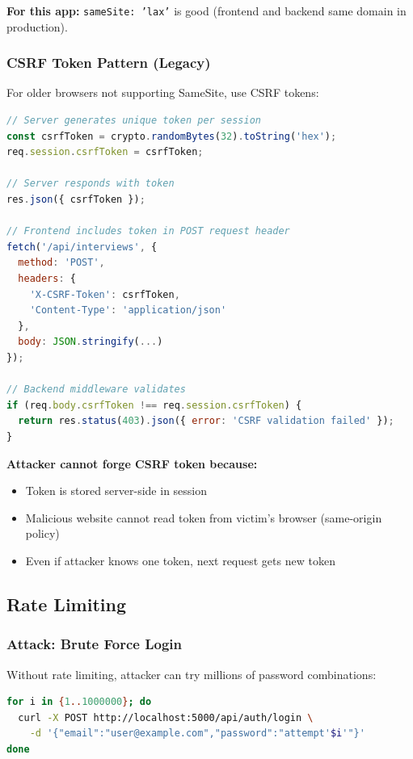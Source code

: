 \documentclass[12pt,a4paper,oneside]{article}
\begin{document}
\textbf{For this app:} \texttt{sameSite: 'lax'} is good (frontend and backend same domain in production).

\subsubsection{CSRF Token Pattern (Legacy)}

For older browsers not supporting SameSite, use CSRF tokens:

\begin{lstlisting}[language=JavaScript, caption=CSRF Token Pattern]
// Server generates unique token per session
const csrfToken = crypto.randomBytes(32).toString('hex');
req.session.csrfToken = csrfToken;

// Server responds with token
res.json({ csrfToken });

// Frontend includes token in POST request header
fetch('/api/interviews', {
  method: 'POST',
  headers: {
    'X-CSRF-Token': csrfToken,
    'Content-Type': 'application/json'
  },
  body: JSON.stringify(...)
});

// Backend middleware validates
if (req.body.csrfToken !== req.session.csrfToken) {
  return res.status(403).json({ error: 'CSRF validation failed' });
}
\end{lstlisting}

\textbf{Attacker cannot forge CSRF token because:}

\begin{itemize}
    \item Token is stored server-side in session
    \item Malicious website cannot read token from victim's browser (same-origin policy)
    \item Even if attacker knows one token, next request gets new token
\end{itemize}

\subsection{Rate Limiting}

\subsubsection{Attack: Brute Force Login}

Without rate limiting, attacker can try millions of password combinations:

\begin{lstlisting}[language=bash, caption=Brute Force Attack]
for i in {1..1000000}; do
  curl -X POST http://localhost:5000/api/auth/login \
    -d '{"email":"user@example.com","password":"attempt'$i'"}'
done
\end{lstlisting}
\end{document}

